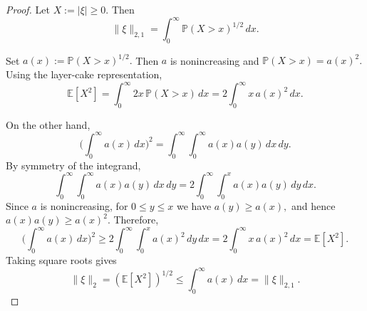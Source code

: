 \documentclass[12pt]{article}
\renewcommand{\(}{\left(}%
\renewcommand{\)}{\right)}%
\renewcommand{\[}{\left[}%
\renewcommand{\]}{\right]}%
\newtheorem{proof}{Proof.}}
\begin{document}
\begin{proof}
Let $X := |\xi| \ge 0$. Then
\begin{equation*}
\|\xi\|_{2,1}
=
\int_{0}^{\infty}
\mathbb P(X>x)^{1/2}\,dx.
\end{equation*}

Set $a(x) := \mathbb P(X>x)^{1/2}.$
Then $a$ is nonincreasing and $\mathbb P(X>x) = a(x)^2.$
Using the layer-cake representation,
\begin{equation*}
\mathbb E[X^2]
=
\int_0^\infty 2x\,\mathbb P(X>x)\,dx
=
2\int_0^\infty x\,a(x)^2\,dx.
\end{equation*}

On the other hand,
\begin{equation*}
\Big(\int_0^\infty a(x)\,dx\Big)^2
=
\int_0^\infty\int_0^\infty a(x)a(y)\,dx\,dy.
\end{equation*}
By symmetry of the integrand,
\begin{equation*}
\int_0^\infty\int_0^\infty a(x)a(y)\,dx\,dy
=
2\int_0^\infty\int_0^x a(x)a(y)\,dy\,dx.
\end{equation*}
Since $a$ is nonincreasing, for $0\le y\le x$ we have $a(y) \ge a(x),$
and hence $a(x)a(y) \ge a(x)^2.$
Therefore,
\begin{equation*}
\Big(\int_0^\infty a(x)\,dx\Big)^2
\ge
2\int_0^\infty\int_0^x a(x)^2\,dy\,dx
=
2\int_0^\infty x\,a(x)^2\,dx
=
\mathbb E[X^2].
\end{equation*}
Taking square roots gives
\begin{equation*}
\|\xi\|_2 = (\mathbb E[X^2])^{1/2}
\le
\int_0^\infty a(x)\,dx
=
\|\xi\|_{2,1}.
\end{equation*}




\end{proof}
\end{document}
